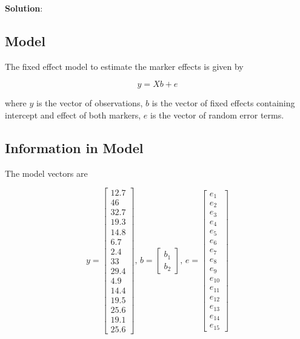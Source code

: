 \documentclass[
]{article}
\newcommand{\solstart}
{\vspace{3ex}\textbf{Solution}:}
\begin{document}
\solstart

\hypertarget{model-1}{%
\subsection{Model}\label{model-1}}

The fixed effect model to estimate the marker effects is given by

\[y = Xb + e\]

where \(y\) is the vector of observations, \(b\) is the vector of fixed
effects containing intercept and effect of both markers, \(e\) is the
vector of random error terms.

\hypertarget{information-in-model}{%
\subsection{Information in Model}\label{information-in-model}}

The model vectors are

\[
y = \begin{bmatrix} 12.7 \\46 \\32.7 \\19.3 \\14.8 \\6.7 \\2.4 \\33 \\29.4 \\4.9 \\14.4 \\19.5 \\25.6 \\19.1 \\25.6\end{bmatrix} 
\text{, }b = \begin{bmatrix} b_{1} \\b_{2}\end{bmatrix} 
\text{, }e = \begin{bmatrix} e_{1} \\e_{2} \\e_{3} \\e_{4} \\e_{5} \\e_{6} \\e_{7} \\e_{8} \\e_{9} \\e_{10} \\e_{11} \\e_{12} \\e_{13} \\e_{14} \\e_{15}\end{bmatrix} 
\]
\end{document}
